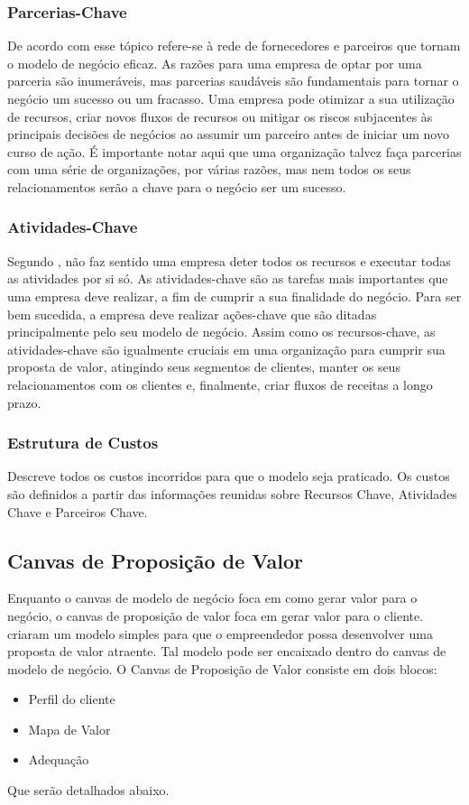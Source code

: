 \subsubsection{Parcerias-Chave}
\label{cha:parcerias_chave}
De acordo com  esse tópico refere-se à rede de fornecedores e parceiros que
tornam o modelo de negócio eficaz. As razões para uma empresa de optar por uma parceria são inumeráveis, mas parcerias saudáveis são fundamentais para tornar o negócio um sucesso ou um
fracasso. Uma empresa pode otimizar a sua utilização de recursos, criar novos fluxos de recursos ou
mitigar os riscos subjacentes às principais decisões de negócios ao assumir um parceiro antes de
iniciar um novo curso de ação. É importante notar aqui que uma organização talvez faça parcerias com
uma série de organizações, por várias razões, mas nem todos os seus relacionamentos serão a chave
para o negócio ser um sucesso.

\subsubsection{Atividades-Chave}
\label{cha:atividades_chave}
Segundo , não faz sentido uma empresa deter todos os recursos e executar todas as atividades por si só. As atividades-chave são as tarefas mais importantes que uma empresa deve realizar, a fim de cumprir a sua finalidade do negócio. Para ser bem sucedida, a empresa deve realizar ações-chave que são ditadas principalmente pelo seu modelo de negócio. Assim como os recursos-chave, as atividades-chave são igualmente cruciais em uma organização para cumprir sua proposta de valor, atingindo seus segmentos de clientes, manter os seus relacionamentos com os clientes e, finalmente, criar fluxos de receitas a longo prazo.

\subsubsection{Estrutura de Custos}
\label{cha:estrutura_de_custos}
Descreve todos os custos incorridos para que o modelo seja praticado. Os custos são definidos a partir das informações reunidas sobre Recursos Chave, Atividades Chave e Parceiros Chave. \cite{businessmodel}

\subsection{Canvas de Proposição de Valor}
\label{cha:canvas_de_proposicao_de_valor}
Enquanto o canvas de modelo de negócio foca em como gerar valor para o negócio, o canvas de proposição de valor foca em gerar valor para o cliente.
 criaram um modelo simples para que o empreendedor possa desenvolver uma proposta de valor atraente. Tal modelo pode ser encaixado dentro do canvas de modelo de negócio. 
O Canvas de Proposição de Valor consiste em dois blocos:
\begin{itemize}
\item Perfil do cliente
\item Mapa de Valor
\item Adequação
\end{itemize}
Que serão detalhados abaixo.

